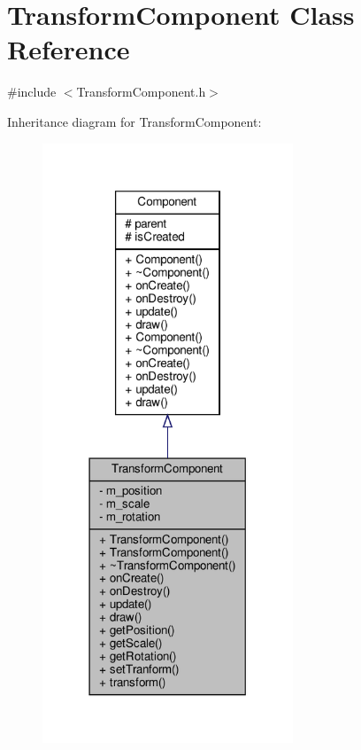 \hypertarget{classTransformComponent}{}\section{Transform\+Component Class Reference}
\label{classTransformComponent}


{\ttfamily \#include $<$Transform\+Component.\+h$>$}



Inheritance diagram for Transform\+Component\+:
\nopagebreak
\begin{figure}[H]
\begin{center}
\leavevmode
\includegraphics[width=212pt]{classTransformComponent__inherit__graph}
\end{center}
\end{figure}


